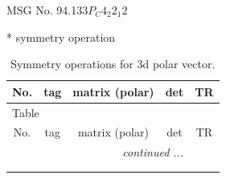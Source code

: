 \documentclass[fleqn,8pt]{jsarticle}
\begin{document}
\setcounter{MaxMatrixCols}{32}

\renewcommand{\tablename}{Table~}
\renewcommand{\figurename}{Figure~}
\begin{center}
\LARGE
MSG No. 94.133\quad$P_{C}4_{2}2_{1}2$
\end{center}
* symmetry operation
\renewcommand{\arraystretch}{1.3}
\begin{longtable}{ccccc}
\caption{Symmetry operations for 3d polar vector.}
 \\
 \hline \hline
No. & tag & matrix (polar) & det & TR \\ \hline \endfirsthead

\multicolumn{4}{l}{\tablename\ \thetable{}} \\
 \hline \hline
No. & tag & matrix (polar) & det & TR \\ \hline \endhead

 \hline \hline
\multicolumn{4}{r}{\footnotesize\it continued ...} \\ \endfoot

 \hline \hline
\multicolumn{4}{r}{} \\ \endlastfoot


\end{longtable}
\end{document}
